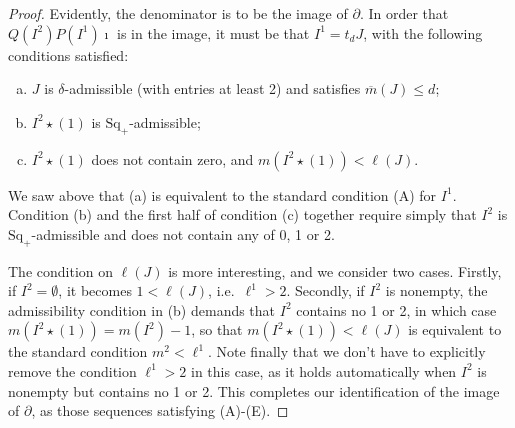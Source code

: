 \documentclass[10pt]{article}
\renewcommand{\Q}{Q}
\newcommand{\SqShift}{\Sq_{+}}
\newcommand{\Sq}{\mathrm{Sq}}
\newcommand{\minDim}{m}
\newcommand{\minDimP}{\overline{m}}
\begin{document}
\begin{CalculatingRepeatedKoszul}
\begin{proof}
Evidently, the denominator is to be the image of $\partial$. In order that $\Q(I^2)P(I^1)\imath$ is in the image, it must be that $I^1=t_dJ$, with the following conditions satisfied:
\begin{enumerate}[a)]
\squishlist
\setlength{\parindent}{.25in}
\item $J$ is $\delta$-admissible (with entries at least 2) and satisfies $\minDimP(J)\leq d$;
\item $I^2\star(1)$ is $\SqShift$-admissible;
\item $I^2\star(1)$ does not contain zero, and $\minDim(I^2\star(1))<\ell(J)$.
\end{enumerate}
We saw above that (a) is equivalent to the standard condition \textup{(A)} for $I^1$. Condition (b) and the first half of condition (c) together require simply that $I^2$ is $\SqShift$-admissible and does not contain any of 0, 1 or 2.

The condition on $\ell(J)$ is more interesting, and we consider two cases. Firstly, if $I^2=\emptyset$, it becomes $1<\ell(J)$, i.e.\ $\ell^1>2$. Secondly, if $I^2$ is nonempty, the admissibility condition in (b) demands that $I^2$ contains no 1 or 2, in which case $\minDim(I^2\star(1))=\minDim(I^2)-1$, so that $\minDim(I^2\star(1))<\ell(J)$ is equivalent to the standard condition $\minDim^2<\ell^1$. Note finally that we don't have to explicitly remove the condition $\ell^1>2$ in this case, as it holds automatically when $I^2$ is nonempty but contains no 1 or 2. This completes our identification of the image of $\partial$, as those sequences satisfying \textup{(A)}-\textup{(E)}.




\end{proof}
\end{CalculatingRepeatedKoszul}
\end{document}
